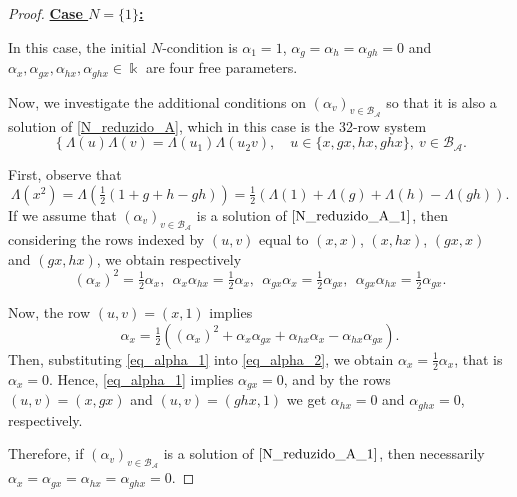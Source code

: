 \documentclass[reqno]{amsart}
\theoremstyle{definition}
\numberwithin{equation}{section}\theoremstyle{plain}
\newcommand{\B}{\mathcal{B}}
\theoremstyle{definition}
\def \k {\Bbbk}
\def \A {\mathcal{A}}
\begin{document}
\begin{proof}
\medbreak

\textbf{\underline{Case $N=\{1\}$:}}

\smallbreak

In this case, the initial $N$-condition is $\alpha_1 = 1$, $\alpha_g = \alpha_h = \alpha_{gh} = 0$ and $\alpha_x, \alpha_{gx}, \alpha_{hx}, \alpha_{ghx} \in \k$ are four free parameters.

Now, we investigate the additional conditions on $\left(\alpha_v\right)_{v \in \B_\A}$ so that it is also a solution of \eqref{N_reduzido_A}, which in this case is the 32-row system
\begin{equation}\label{N_reduzido_A_1}
\left\{\Lambda(u)\Lambda(v) = \Lambda(u_1)\Lambda(u_2 v),
\right. \quad u \in \{x, gx, hx, ghx\},\ v \in \B_\A.
\end{equation}

First, observe that 
$$\Lambda(x^2)= \Lambda \left(\tfrac{1}{2}\left(1+g+h-gh\right)\right)=\tfrac{1}{2}\left(\Lambda(1)+\Lambda(g)+\Lambda(h)-\Lambda(gh)\right).$$
If we assume that $\left(\alpha_v\right)_{v \in \B_\A}$ is a solution of $\eqref{N_reduzido_A_1}$, then
considering the rows indexed by $(u,v)$ equal to $(x,x)$, $(x,hx)$, $(gx,x)$ and $(gx,hx)$, we obtain respectively
\begin{equation}\label{eq_alpha_1}
    (\alpha_x)^2 = \tfrac{1}{2} \alpha_x, \ \ \alpha_x \alpha_{hx} =  \tfrac{1}{2} \alpha_x, \ \ \alpha_{gx}\alpha_x = \tfrac{1}{2} \alpha_{gx}, \ \  \alpha_{gx} \alpha_{hx} =  \tfrac{1}{2} \alpha_{gx}.
    \end{equation}

Now, the row $(u,v)=(x,1)$ implies
\begin{equation}\label{eq_alpha_2}
\alpha_x = \tfrac{1}{2} \left( (\alpha_x)^2 + \alpha_{x} \alpha_{gx} + \alpha_{hx} \alpha_{x} - \alpha_{hx} \alpha_{gx}\right).
\end{equation}
Then, substituting \eqref{eq_alpha_1} into \eqref{eq_alpha_2}, we obtain $\alpha_x = \tfrac{1}{2} \alpha_x$, that is $\alpha_x =0$.
Hence, \eqref{eq_alpha_1} implies $\alpha_{gx}=0$, and by the rows $(u,v)=(x, gx)$ and $(u,v)=(ghx,1)$ we get $\alpha_{hx}= 0$ and $\alpha_{ghx}=0$, respectively.

\smallbreak

Therefore, if $\left(\alpha_v\right)_{v \in \B_\A}$ is a solution of $\eqref{N_reduzido_A_1}$, then necessarily
$ \alpha_{x} = \alpha_{gx} = \alpha_{hx} = \alpha_{ghx} =0.$


\end{proof}
\end{document}
